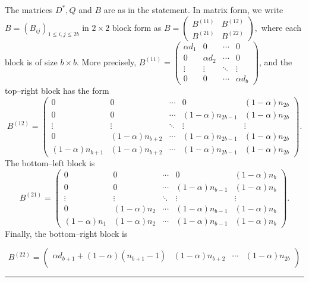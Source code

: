 \documentclass[12pt,twoside]{article}
\renewenvironment{proof}{{\noindent\bfseries Proof.}}{\qed}
\def\qed{\nolinebreak\hfill\rule{.2cm}{.2cm}\par\addvspace{.5cm}}
\begin{document}
\begin{proof}
	 The matrices $D^{\ast},Q$ and $B$ are as in the statement. In matrix form, we write  $B=(B_{ij})_{1\le i,j\le 2b}$ in $2\times 2$ block form as $B=	\begin{pmatrix}
		B^{(11)} & B^{(12)}\\[4pt]
		B^{(21)} & B^{(22)}
	\end{pmatrix},$	where each block is of size $b\times b$. More precisely,  $B^{(11)}=
	\begin{pmatrix}
		\alpha d_1 & 0           & \cdots & 0\\
		0          & \alpha d_2  & \cdots & 0\\
		\vdots     & \vdots      & \ddots & \vdots\\
		0          & 0           & \cdots & \alpha d_b
	\end{pmatrix}$, and the top–right block has the form
	\[
	B^{(12)}=
	\begin{pmatrix}
		0              & 0              & \cdots & 0                  & (1-\alpha)n_{2b}\\[2pt]
		0              & 0              & \cdots & (1-\alpha)n_{2b-1} & (1-\alpha)n_{2b}\\[2pt]
		\vdots         & \vdots         & \ddots & \vdots             & \vdots\\[2pt]
		0              & (1-\alpha)n_{b+2} & \cdots & (1-\alpha)n_{2b-1} & (1-\alpha)n_{2b}\\[2pt]
		(1-\alpha)n_{b+1} & (1-\alpha)n_{b+2} & \cdots & (1-\alpha)n_{2b-1} & (1-\alpha)n_{2b}
	\end{pmatrix}.
	\]
	The bottom–left block is
	\[
	B^{(21)}=
	\begin{pmatrix}
		0              & 0              & \cdots & 0               & (1-\alpha)n_{b}\\[2pt]
		0              & 0              & \cdots & (1-\alpha)n_{b-1} & (1-\alpha)n_{b}\\[2pt]
		\vdots         & \vdots         & \ddots & \vdots          & \vdots\\[2pt]
		0              & (1-\alpha)n_{2} & \cdots & (1-\alpha)n_{b-1} & (1-\alpha)n_{b}\\[2pt]
		(1-\alpha)n_{1} & (1-\alpha)n_{2} & \cdots & (1-\alpha)n_{b-1} & (1-\alpha)n_{b}
	\end{pmatrix}.
	\]
	Finally, the bottom–right block is
	\begin{footnotesize}
		\[
	B^{(22)}=
	\begin{pmatrix}
		\alpha d_{b+1} + (1-\alpha)(n_{b+1}-1) & (1-\alpha)n_{b+2} & \cdots & (1-\alpha)n_{2b}\\[2pt]

\end{pmatrix}\]
\end{footnotesize}
\end{proof}
\end{document}
